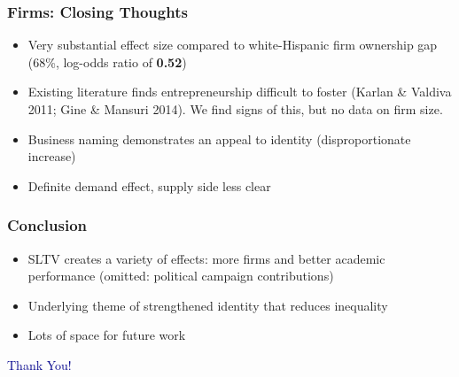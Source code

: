 \documentclass{beamer}
\begin{document}
\begin{frame}
\frametitle{Firms: Closing Thoughts}
\begin{itemize}
\item Very substantial effect size compared to white-Hispanic firm ownership gap (68\%, log-odds ratio of \textbf{0.52}) 
\item Existing literature finds entrepreneurship difficult to foster {\footnotesize (Karlan \& Valdiva 2011; Gine \& Mansuri 2014)}. We find signs of this, but no data on firm size. \\
\item Business naming demonstrates an appeal to identity (disproportionate increase) \\
\item Definite demand effect, supply side less clear
\end{itemize}
\end{frame}



\begin{frame}
\frametitle{Conclusion}
\begin{itemize}
\item SLTV creates a variety of effects: more firms and better academic performance (omitted: political campaign contributions)
\item Underlying theme of strengthened identity that reduces inequality
\item Lots of space for future work
\end{itemize}
\end{frame}

		
\begin{frame}
\Large \centering \textcolor{darkblue}{Thank You!}
\end{frame}

\end{document}
